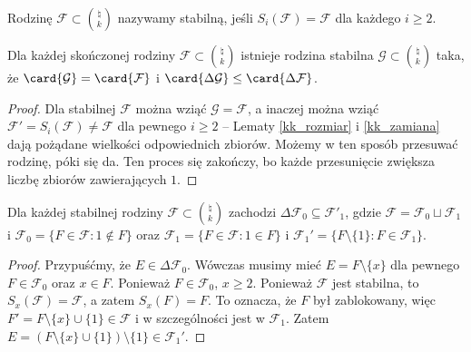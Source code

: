 \begin{definition}
	Rodzinę $\mathcal F \subset \binom{\natural}{k}$ nazywamy stabilną, jeśli
	$S_i(\mathcal F) = \mathcal F$ dla każdego $i\ge 2$.
\end{definition}

\begin{lemma}
	\label{kk_stabilna}
	Dla każdej skończonej rodziny $\mathcal F\subset \binom{\natural}{k}$ istnieje
	rodzina stabilna $\mathcal G\subset\binom{\natural}{k}$ taka, że $\card{\mathcal G}
		= \card{\mathcal F}$ i $\card{\Delta \mathcal G} \le \card{\Delta \mathcal F}$.
\end{lemma}
\begin{proof}
	Dla stabilnej $\mathcal F$ można wziąć $\mathcal G = \mathcal F$, a inaczej
	można wziąć $\mathcal F' = S_i(\mathcal F) \ne \mathcal F$ dla pewnego $i\ge
		2$ -- Lematy \ref{kk_rozmiar} i \ref{kk_zamiana} dają pożądane wielkości
	odpowiednich zbiorów. Możemy w ten sposób przesuwać rodzinę, póki się da. Ten
	proces się zakończy, bo każde przesunięcie zwiększa liczbę zbiorów
	zawierających $1$.
\end{proof}

\begin{lemma}
	\label{kk_zawieranie}
	Dla każdej stabilnej rodziny $\mathcal F\subset \binom{\natural}{k}$ zachodzi
	$\Delta\mathcal F_0 \subseteq \mathcal F'_1$, gdzie $\mathcal F = \mathcal
		F_0 \sqcup \mathcal F_1$ i $\mathcal F_0 = \{F \in \mathcal F : 1 \notin F\}$
	oraz $\mathcal F_1 = \{F \in \mathcal F : 1 \in F\}$ i $\mathcal F_1' = \{F
		\setminus \{1\} : F \in \mathcal F_1\}$.
\end{lemma}
\begin{proof}
	Przypuśćmy, że $E \in \Delta\mathcal F_0$. Wówczas musimy mieć $E = F
		\setminus \{x\}$ dla pewnego $F \in\mathcal F_0$ oraz $x \in F$. Ponieważ $F
		\in\mathcal F_0$, $x \geq 2$. Ponieważ $\mathcal F$ jest stabilna, to
	$S_x(\mathcal F) =\mathcal F$, a zatem $S_x(F) = F$. To oznacza, że $F$ był
	zablokowany, więc $F' = F \setminus \{x\} \cup \{1\} \in \mathcal F$ i w
	szczególności jest w $\mathcal F_1$. Zatem $E = (F \setminus \{x\} \cup
		\{1\}) \setminus \{1\} \in \mathcal F_1'$.
\end{proof}

